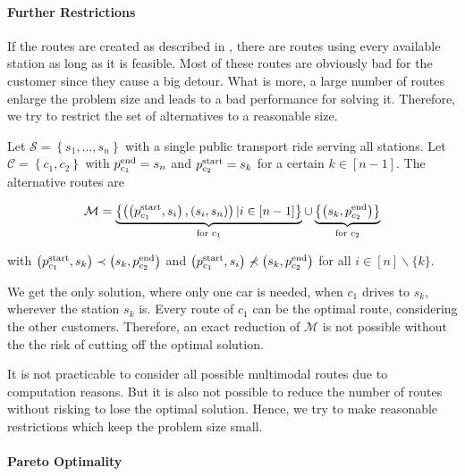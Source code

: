 \paragraph{Further Restrictions} \parfill

If the routes are created as described in , there are routes using every available station as long as it is feasible. Most of these routes are obviously bad for the customer since they cause a big detour. What is more, a large number of routes enlarge the problem size and leads to  a bad performance for solving it. Therefore, we try to restrict the set of alternatives to a reasonable size.

\begin{example}

Let $\mathcal{S}=\left\{s_1,\dots,s_n\right\}$ with a single public transport ride serving all stations. Let $\mathcal{C}=\left\{c_1,c_2\right\}$ with $p^{\operatorname{end}}_{c_1}=s_n$ and $p^{\operatorname{start}}_{c_2}=s_k$ for a certain $k\in[n-1]$. The alternative routes are

\begin{align*}
	\mathcal{M} = \underbrace{\left\{\left(\left(p^{\operatorname{start}}_{c_1},s_i\right),\left(s_i,s_n\right)\right)|i\in[n-1]\right\}}_{\text{for }c_1}\cup\underbrace{\left\{\left(s_k,p^{\operatorname{end}}_{c_2}\right)\right\}}_{\text{for }c_2}
\end{align*}

with $\left(p^{\operatorname{start}}_{c_1},s_k\right)\prec\left(s_k,p^{\operatorname{end}}_{c_2}\right)$ and $\left(p^{\operatorname{start}}_{c_1},s_i\right)\not\prec\left(s_k,p^{\operatorname{end}}_{c_2}\right)$ for all $i\in[n]\backslash\{k\}$. 

We get the only solution, where only one car is needed, when $c_1$ drives to $s_k$, wherever the station $s_k$ is. Every route of $c_1$ can be the optimal route, considering the other customers. Therefore, an exact reduction of $\mathcal{M}$ is not possible without the the risk of cutting off the optimal solution.
	
\end{example}

It is not practicable to consider all possible multimodal routes due to computation reasons. But it is also not possible to reduce the number of routes without risking to lose the optimal solution. Hence, we try to make reasonable restrictions which keep the problem size small.

\paragraph{Pareto Optimality} \parfill

